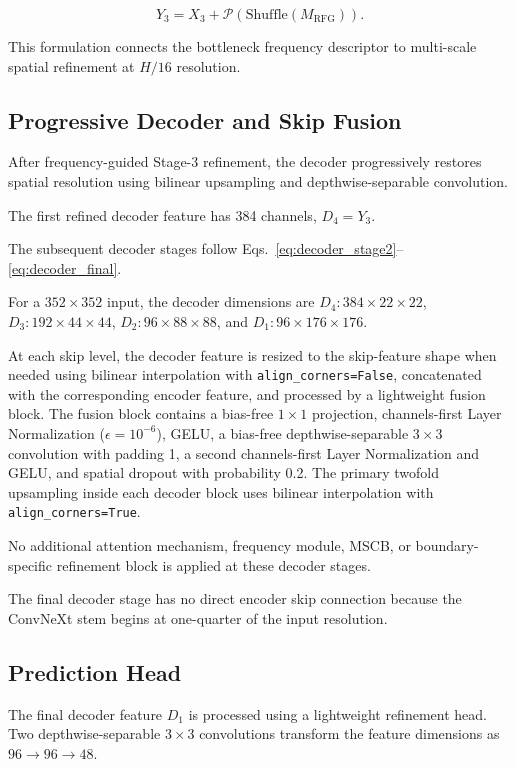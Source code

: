 \begin{equation}
Y_3
=
X_3+
\mathcal{P}
\left(
\mathrm{Shuffle}(M_{\mathrm{RFG}})
\right).
\label{eq:rfg_final_output}
\end{equation}

This formulation connects the bottleneck frequency descriptor to multi-scale spatial refinement at $H/16$ resolution.

\subsection{Progressive Decoder and Skip Fusion}

After frequency-guided Stage-3 refinement, the decoder progressively restores spatial resolution using bilinear upsampling and depthwise-separable convolution.

The first refined decoder feature has 384 channels, $D_4=Y_3$.

The subsequent decoder stages follow Eqs.~\eqref{eq:decoder_stage2}--\eqref{eq:decoder_final}.

For a $352\times352$ input, the decoder dimensions are $D_4:384\times22\times22$, $D_3:192\times44\times44$, $D_2:96\times88\times88$, and $D_1:96\times176\times176$.

At each skip level, the decoder feature is resized to the skip-feature shape when
needed using bilinear interpolation with \texttt{align\_corners=False}, concatenated
with the corresponding encoder feature, and processed by a lightweight fusion block.
The fusion block contains a bias-free $1\times1$ projection, channels-first Layer
Normalization ($\epsilon=10^{-6}$), GELU, a bias-free depthwise-separable $3\times3$
convolution with padding 1, a second channels-first Layer Normalization and GELU, and
spatial dropout with probability 0.2. The primary twofold upsampling inside each
decoder block uses bilinear interpolation with \texttt{align\_corners=True}.

No additional attention mechanism, frequency module, MSCB, or boundary-specific refinement block is applied at these decoder stages.

The final decoder stage has no direct encoder skip connection because the ConvNeXt stem begins at one-quarter of the input resolution.

\subsection{Prediction Head}

The final decoder feature $D_1$ is processed using a lightweight refinement head. Two depthwise-separable $3\times3$ convolutions transform the feature dimensions as $96\rightarrow96\rightarrow48$.

